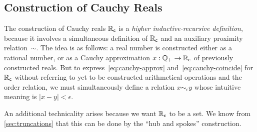 \subsection{Construction of Cauchy Reals}
\label{sec:constr-cauchy-reals}

The construction of Cauchy reals $\mathbb{R}_\mathsf{c}$ is a \emph{higher inductive-recursive definition},
because it involves a simultaneous definition of $\mathbb{R}_\mathsf{c}$ and an auxiliary proximity
relation~$\sim$. The idea is as follows: a real number is constructed either as a rational
number, or as a Cauchy approximation $x : \mathbb{Q}_{+} \to \mathbb{R}_\mathsf{c}$ of previously constructed reals.
But to express~\eqref{eq:cauchy-approx} and~\eqref{eq:cauchy-coincide} for $\mathbb{R}_\mathsf{c}$ without
referring to yet to be constructed arithmetical operations and the order relation, we must
simultaneously define a relation $x \sim_\epsilon y$ whose intuitive meaning is $|x - y| <
\epsilon$.

An additional technicality arises because we want $\mathbb{R}_\mathsf{c}$ to be a set. We know from
\autoref{sec:truncations} that this can be done by the ``hub and spokes'' construction.

